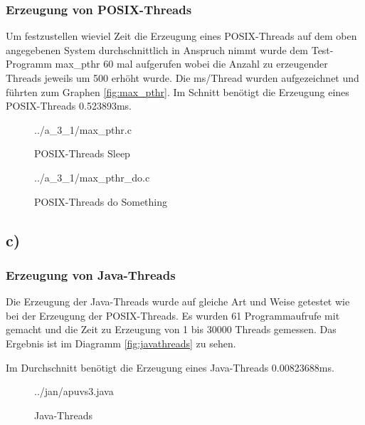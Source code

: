 \documentclass[a4paper,
12pt,
BCOR12mm,
]{scrartcl}
\begin{document}
\subsubsection*{Erzeugung von POSIX-Threads}
Um festzustellen wieviel Zeit die Erzeugung eines POSIX-Threads auf dem oben angegebenen System durchschnittlich
in Anspruch nimmt wurde dem Test-Programm max\_pthr 60 mal aufgerufen wobei die Anzahl zu erzeugender Threads
jeweils um 500 erhöht wurde. Die ms/Thread wurden aufgezeichnet und führten zum Graphen \ref{fig:max_pthr}.
Im Schnitt benötigt die Erzeugung eines POSIX-Threads 0.523893ms.


\begin{figure}[h!]
	\begin{center}
		 {../a_3_1/max_pthr.c}
	\end{center}
	\caption{POSIX-Threads Sleep}
	\label{fig:max_pthr_listing}
\end{figure} 
\begin{figure}[h!]
	\begin{center}
		 {../a_3_1/max_pthr_do.c}
	\end{center}
	\caption{POSIX-Threads do Something}
	\label{fig:max_pthr_do_listing}
\end{figure} 





\subsection*{c)}
\subsubsection*{Erzeugung von Java-Threads}
Die Erzeugung der Java-Threads wurde auf gleiche Art und Weise getestet wie bei der Erzeugung der POSIX-Threads.
Es wurden 61 Programmaufrufe mit gemacht und die Zeit zu Erzeugung von 1 bis 30000 Threads gemessen.
Das Ergebnis ist im Diagramm \ref{fig:javathreads} zu sehen.

Im Durchschnitt benötigt die Erzeugung eines Java-Threads 0.00823688ms.

\begin{figure}[h!]
	\begin{center}
		 {../jan/apuvs3.java}
	\end{center}
	\caption{Java-Threads}
	\label{fig:java_listing}
\end{figure} 
\end{document}
